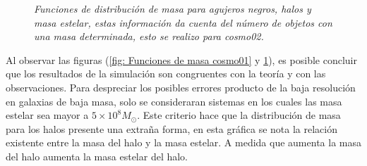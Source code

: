 \begin{figure}
\centering
{}
\caption{\emph{Funciones de distribución de masa para agujeros negros, halos y masa estelar, estas información da cuenta del número de objetos con una masa determinada, esto se realizo para {\it{cosmo02}}.}}
 \label{fig: Funciones de masa cosmo02}
\end{figure}
%

Al observar las figuras (\ref{fig: Funciones de masa cosmo01} y \ref{fig: Funciones de masa cosmo02}), es posible concluir que los resultados de la simulación son congruentes con la teoría y con las observaciones. Para despreciar los posibles errores producto de la baja resolución en galaxias de baja masa, solo se consideraran sistemas en los cuales las masa estelar sea mayor a $5\times 10^{8}M_{\odot}$. Este criterio hace que la distribución de masa para los halos presente una extraña forma, en esta gráfica se nota la relación existente entre la masa del halo y la masa estelar. A medida que aumenta la masa del halo aumenta la masa estelar del halo. 

